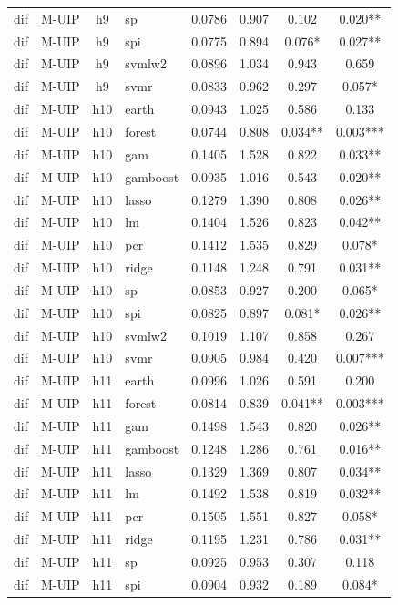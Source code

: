 \begin{ThreePartTable}
\begin{longtable}[t]{llclcccc}
dif & M-UIP & h9 & sp & 0.0786 & 0.907 & 0.102 & 0.020**\\
dif & M-UIP & h9 & spi & 0.0775 & 0.894 & 0.076* & 0.027**\\
dif & M-UIP & h9 & svmlw2 & 0.0896 & 1.034 & 0.943 & 0.659\\
dif & M-UIP & h9 & svmr & 0.0833 & 0.962 & 0.297 & 0.057*\\
\addlinespace
dif & M-UIP & h10 & earth & 0.0943 & 1.025 & 0.586 & 0.133\\
dif & M-UIP & h10 & forest & 0.0744 & 0.808 & 0.034** & 0.003***\\
dif & M-UIP & h10 & gam & 0.1405 & 1.528 & 0.822 & 0.033**\\
dif & M-UIP & h10 & gamboost & 0.0935 & 1.016 & 0.543 & 0.020**\\
dif & M-UIP & h10 & lasso & 0.1279 & 1.390 & 0.808 & 0.026**\\
dif & M-UIP & h10 & lm & 0.1404 & 1.526 & 0.823 & 0.042**\\
dif & M-UIP & h10 & pcr & 0.1412 & 1.535 & 0.829 & 0.078*\\
dif & M-UIP & h10 & ridge & 0.1148 & 1.248 & 0.791 & 0.031**\\
dif & M-UIP & h10 & sp & 0.0853 & 0.927 & 0.200 & 0.065*\\
dif & M-UIP & h10 & spi & 0.0825 & 0.897 & 0.081* & 0.026**\\
dif & M-UIP & h10 & svmlw2 & 0.1019 & 1.107 & 0.858 & 0.267\\
dif & M-UIP & h10 & svmr & 0.0905 & 0.984 & 0.420 & 0.007***\\
\addlinespace
dif & M-UIP & h11 & earth & 0.0996 & 1.026 & 0.591 & 0.200\\
dif & M-UIP & h11 & forest & 0.0814 & 0.839 & 0.041** & 0.003***\\
dif & M-UIP & h11 & gam & 0.1498 & 1.543 & 0.820 & 0.026**\\
dif & M-UIP & h11 & gamboost & 0.1248 & 1.286 & 0.761 & 0.016**\\
dif & M-UIP & h11 & lasso & 0.1329 & 1.369 & 0.807 & 0.034**\\
dif & M-UIP & h11 & lm & 0.1492 & 1.538 & 0.819 & 0.032**\\
dif & M-UIP & h11 & pcr & 0.1505 & 1.551 & 0.827 & 0.058*\\
dif & M-UIP & h11 & ridge & 0.1195 & 1.231 & 0.786 & 0.031**\\
dif & M-UIP & h11 & sp & 0.0925 & 0.953 & 0.307 & 0.118\\
dif & M-UIP & h11 & spi & 0.0904 & 0.932 & 0.189 & 0.084*\\

\end{longtable}
\end{ThreePartTable}

